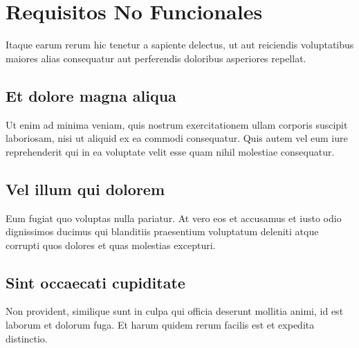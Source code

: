 \section{Requisitos No Funcionales}

Itaque earum rerum hic tenetur a sapiente delectus, ut aut reiciendis voluptatibus maiores alias consequatur aut perferendis doloribus asperiores repellat.

\subsection{Et dolore magna aliqua}
Ut enim ad minima veniam, quis nostrum exercitationem ullam corporis suscipit laboriosam, nisi ut aliquid ex ea commodi consequatur. Quis autem vel eum iure reprehenderit qui in ea voluptate velit esse quam nihil molestiae consequatur.

\subsection{Vel illum qui dolorem}
Eum fugiat quo voluptas nulla pariatur. At vero eos et accusamus et iusto odio dignissimos ducimus qui blanditiis praesentium voluptatum deleniti atque corrupti quos dolores et quas molestias excepturi.

\subsection{Sint occaecati cupiditate}
Non provident, similique sunt in culpa qui officia deserunt mollitia animi, id est laborum et dolorum fuga. Et harum quidem rerum facilis est et expedita distinctio.